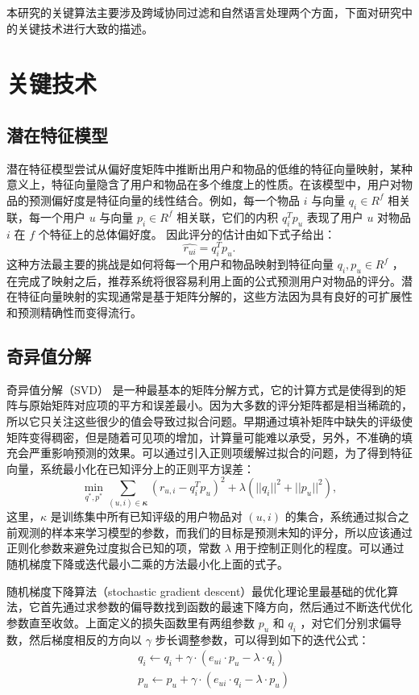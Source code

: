 本研究的关键算法主要涉及跨域协同过滤和自然语言处理两个方面，下面对研究中的关键技术进行大致的描述。

\section{关键技术}
\subsection{潜在特征模型}
潜在特征模型尝试从偏好度矩阵中推断出用户和物品的低维的特征向量映射，某种意义上，特征向量隐含了用户和物品在多个维度上的性质。在该模型中，用户对物品的预测偏好度是特征向量的线性结合。例如，每一个物品 $i$ 与向量 $q_i \in R^f$ 相关联，每一个用户 $u$ 与向量 $p_i \in R^f$ 相关联，它们的内积 $q_i^Tp_u$ 表现了用户 $u$ 对物品 $i$ 在 $f$ 个特征上的总体偏好度。 因此评分的估计由如下式子给出：
$$
\hat{r_{ui}} = q_i^Tp_u.
$$
这种方法最主要的挑战是如何将每一个用户和物品映射到特征向量 $q_i, p_u \in R^f$ ，在完成了映射之后，推荐系统将很容易利用上面的公式预测用户对物品的评分。潜在特征向量映射的实现通常是基于矩阵分解的，这些方法因为具有良好的可扩展性和预测精确性而变得流行。

\subsection{奇异值分解}
奇异值分解（SVD）\cite{paterek2007improving} 是一种最基本的矩阵分解方式，它的计算方式是使得到的矩阵与原始矩阵对应项的平方和误差最小。因为大多数的评分矩阵都是相当稀疏的，所以它只关注这些很少的值会导致过拟合问题。早期通过填补矩阵中缺失的评级使矩阵变得稠密，但是随着可见项的增加，计算量可能难以承受，另外，不准确的填充会严重影响预测的效果。可以通过引入正则项缓解过拟合的问题，为了得到特征向量，系统最小化在已知评分上的正则平方误差：
\begin{equation*}
\min_{q^*, p^*} {\sum\limits_{(u,i) \in 𝜿} {{(r_{u,i}-q_i^Tp_u)}^2 + \lambda(||q_i||^2 + ||p_u||^2)} } ,
\end{equation*}
这里，$\kappa$ 是训练集中所有已知评级的用户物品对 $(u,i)$ 的集合，系统通过拟合之前观测的样本来学习模型的参数，而我们的目标是预测未知的评分，所以应该通过正则化参数来避免过度拟合已知的项，常数 $\lambda$ 用于控制正则化的程度。可以通过随机梯度下降或迭代最小二乘的方法最小化上面的式子。

随机梯度下降算法（stochastic gradient descent）最优化理论里最基础的优化算法，它首先通过求参数的偏导数找到函数的最速下降方向，然后通过不断迭代优化参数直至收敛。上面定义的损失函数里有两组参数 $p_{u}$ 和 $q_{i}$ ，对它们分别求偏导数，然后梯度相反的方向以  $𝛾$ 步长调整参数，可以得到如下的迭代公式：
\begin{equation*}
\begin{aligned}
&q_i \leftarrow q_i + 𝛾 \cdot(e_{ui} \cdot p_u -\lambda \cdot q_i)\\
&p_u \leftarrow p_u + 𝛾 \cdot(e_{ui} \cdot q_i- \lambda \cdot p_u)
\end{aligned}
\end{equation*}

